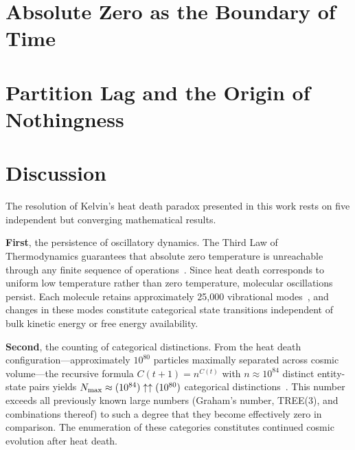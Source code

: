 \section{Absolute Zero as the Boundary of Time}
\label{sec:absolute_zero}


\section{Partition Lag and the Origin of Nothingness}
\label{sec:partition_lag}


\section{Discussion}

The resolution of Kelvin's heat death paradox presented in this work rests on five independent but converging mathematical results.

\textbf{First}, the persistence of oscillatory dynamics. The Third Law of Thermodynamics guarantees that absolute zero temperature is unreachable through any finite sequence of operations~\citep{nernst1906waermetheorem}. Since heat death corresponds to uniform low temperature rather than zero temperature, molecular oscillations persist. Each molecule retains approximately 25,000 vibrational modes~\citep{herzberg1945infrared}, and changes in these modes constitute categorical state transitions independent of bulk kinetic energy or free energy availability.

\textbf{Second}, the counting of categorical distinctions. From the heat death configuration---approximately $10^{80}$ particles maximally separated across cosmic volume---the recursive formula $C(t+1) = n^{C(t)}$ with $n \approx 10^{84}$ distinct entity-state pairs yields $N_{\text{max}} \approx (10^{84}) \uparrow\uparrow (10^{80})$ categorical distinctions~\citep{sachikonye2024observation}. This number exceeds all previously known large numbers (Graham's number, TREE(3), and combinations thereof) to such a degree that they become effectively zero in comparison. The enumeration of these categories constitutes continued cosmic evolution after heat death.

